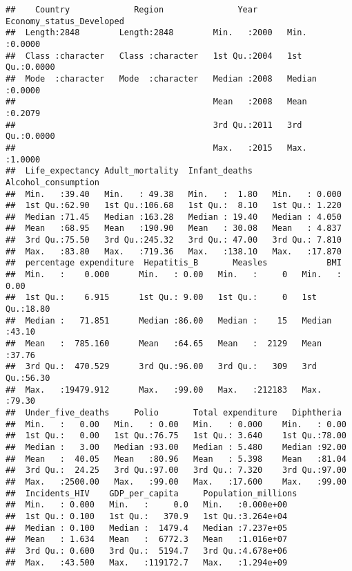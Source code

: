 \documentclass[
]{article}
\begin{document}
\begin{verbatim}
##    Country             Region               Year      Economy_status_Developed
##  Length:2848        Length:2848        Min.   :2000   Min.   :0.0000          
##  Class :character   Class :character   1st Qu.:2004   1st Qu.:0.0000          
##  Mode  :character   Mode  :character   Median :2008   Median :0.0000          
##                                        Mean   :2008   Mean   :0.2079          
##                                        3rd Qu.:2011   3rd Qu.:0.0000          
##                                        Max.   :2015   Max.   :1.0000          
##  Life_expectancy Adult_mortality  Infant_deaths    Alcohol_consumption
##  Min.   :39.40   Min.   : 49.38   Min.   :  1.80   Min.   : 0.000     
##  1st Qu.:62.90   1st Qu.:106.68   1st Qu.:  8.10   1st Qu.: 1.220     
##  Median :71.45   Median :163.28   Median : 19.40   Median : 4.050     
##  Mean   :68.95   Mean   :190.90   Mean   : 30.08   Mean   : 4.837     
##  3rd Qu.:75.50   3rd Qu.:245.32   3rd Qu.: 47.00   3rd Qu.: 7.810     
##  Max.   :83.80   Max.   :719.36   Max.   :138.10   Max.   :17.870     
##  percentage expenditure  Hepatitis_B       Measles            BMI       
##  Min.   :    0.000      Min.   : 0.00   Min.   :     0   Min.   : 0.00  
##  1st Qu.:    6.915      1st Qu.: 9.00   1st Qu.:     0   1st Qu.:18.80  
##  Median :   71.851      Median :86.00   Median :    15   Median :43.10  
##  Mean   :  785.160      Mean   :64.65   Mean   :  2129   Mean   :37.76  
##  3rd Qu.:  470.529      3rd Qu.:96.00   3rd Qu.:   309   3rd Qu.:56.30  
##  Max.   :19479.912      Max.   :99.00   Max.   :212183   Max.   :79.30  
##  Under_five_deaths     Polio       Total expenditure   Diphtheria   
##  Min.   :   0.00   Min.   : 0.00   Min.   : 0.000    Min.   : 0.00  
##  1st Qu.:   0.00   1st Qu.:76.75   1st Qu.: 3.640    1st Qu.:78.00  
##  Median :   3.00   Median :93.00   Median : 5.480    Median :92.00  
##  Mean   :  40.05   Mean   :80.96   Mean   : 5.398    Mean   :81.04  
##  3rd Qu.:  24.25   3rd Qu.:97.00   3rd Qu.: 7.320    3rd Qu.:97.00  
##  Max.   :2500.00   Max.   :99.00   Max.   :17.600    Max.   :99.00  
##  Incidents_HIV    GDP_per_capita     Population_millions
##  Min.   : 0.000   Min.   :     0.0   Min.   :0.000e+00  
##  1st Qu.: 0.100   1st Qu.:   370.9   1st Qu.:3.264e+04  
##  Median : 0.100   Median :  1479.4   Median :7.237e+05  
##  Mean   : 1.634   Mean   :  6772.3   Mean   :1.016e+07  
##  3rd Qu.: 0.600   3rd Qu.:  5194.7   3rd Qu.:4.678e+06  
##  Max.   :43.500   Max.   :119172.7   Max.   :1.294e+09  

\end{verbatim}
\end{document}
